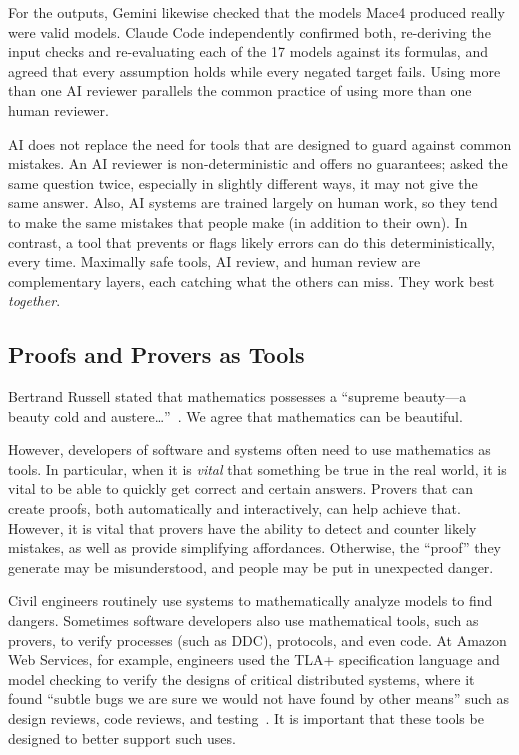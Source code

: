For the outputs, Gemini likewise checked that the models Mace4 produced really were valid models. Claude Code independently confirmed both, re-deriving the input checks and re-evaluating each of the 17 models against its formulas, and agreed that every assumption holds while every negated target fails. Using more than one AI reviewer parallels the common practice of using more than one human reviewer.

AI does not replace the need for tools that are designed to guard against common mistakes. An AI reviewer is non-deterministic and offers no guarantees; asked the same question twice, especially in slightly different ways, it may not give the same answer. Also, AI systems are trained largely on human work, so they tend to make the same mistakes that people make (in addition to their own). In contrast, a tool that prevents or flags likely errors can do this deterministically, every time. Maximally safe tools, AI review, and human review are complementary layers, each catching what the others can miss. They work best \emph{together}.

\subsection{Proofs and Provers as Tools}

Bertrand Russell stated that mathematics possesses a ``supreme beauty---a beauty cold and austere\ldots''~\cite{russell1910study}. We agree that mathematics can be beautiful.

However, developers of software and systems often need to use mathematics as tools. In particular, when it is \emph{vital} that something be true in the real world, it is vital to be able to quickly get correct and certain answers. Provers that can create proofs, both automatically and interactively, can help achieve that. However, it is vital that provers have the ability to detect and counter likely mistakes, as well as provide simplifying affordances. Otherwise, the ``proof'' they generate may be misunderstood, and people may be put in unexpected danger.

Civil engineers routinely use systems to mathematically analyze models to find dangers. Sometimes software developers also use mathematical tools, such as provers, to verify processes (such as DDC), protocols, and even code. At Amazon Web Services, for example, engineers used the TLA+ specification language and model checking to verify the designs of critical distributed systems, where it found ``subtle bugs we are sure we would not have found by other means'' such as design reviews, code reviews, and testing~\cite{newcombe2015aws}. It is important that these tools be designed to better support such uses.

